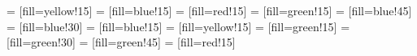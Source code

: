 \documentclass[9pt]{scrartcl}
\begin{document}

	\newcommand{\NaturalElementTextFormat}[7]
	{
    \begin{minipage}{2.21cm}
			\centering
      {\textbf{#1} \hfill \underline{{#7}} \hfill {#2}\textit{{#3}}}
			\\[0.1cm]
			{\Huge\textbf{{#5}}}
			\linebreak
			{\fontsize{9.5}{10.0}\selectfont{#6}}
			\linebreak
			{\small {#4}}
		\end{minipage}
	}
	
	 = [fill=yellow!15]
	 = [fill=blue!15]
	 = [fill=red!15]
	 = [fill=green!15]
   = [fill=blue!45]
   = [fill=blue!30]
   = [fill=blue!15]
   = [fill=yellow!15]
   = [fill=green!15]
   = [fill=green!30]
   = [fill=green!45]
   = [fill=red!15]

  \title{\vspace{-0.5cm}\doctitle}
  \subtitle{\docsubtitle}
  \date{}
	\maketitle
\end{document}
